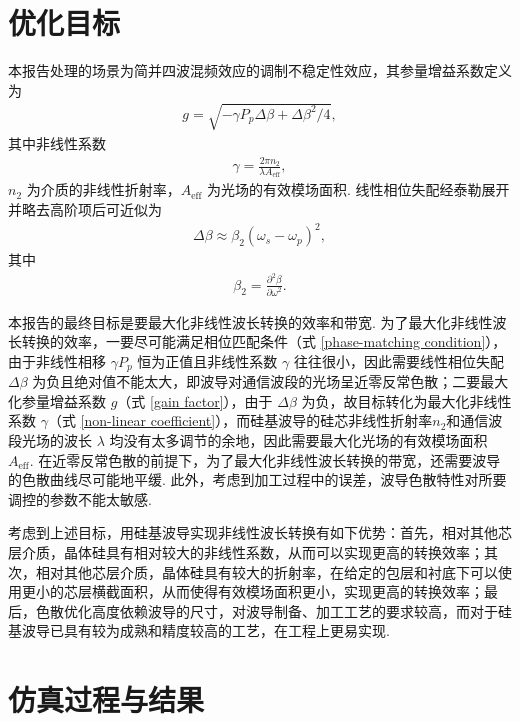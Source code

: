 \documentclass[zh]{assignment}
\begin{document}
\section{优化目标}

本报告处理的场景为简并四波混频效应的调制不稳定性效应，其参量增益系数定义为
\begin{align}
    \label{gain factor}
    g=\sqrt{-\gamma P_p\Delta\beta+\Delta\beta^2/4},
\end{align}
其中非线性系数
\begin{align}
    \label{non-linear coefficient}
    \gamma=\frac{2\pi n_2}{\lambda A_{\text{eff}}},
\end{align}
$n_2$ 为介质的非线性折射率，$A_{\text{eff}}$ 为光场的有效模场面积. 线性相位失配经泰勒展开并略去高阶项后可近似为
\begin{align}
    \Delta\beta\approx\beta_2(\omega_s-\omega_p)^2,
\end{align}
其中
\begin{align}
    \beta_2=\frac{\partial^2\beta}{\partial\omega^2}.
\end{align}

本报告的最终目标是要最大化非线性波长转换的效率和带宽. 为了最大化非线性波长转换的效率，一要尽可能满足相位匹配条件（式 \eqref{phase-matching condition}），由于非线性相移 $\gamma P_p$ 恒为正值且非线性系数 $\gamma$ 往往很小，因此需要线性相位失配 $\Delta\beta$ 为负且绝对值不能太大，即波导对通信波段的光场呈近零反常色散；二要最大化参量增益系数 $g$（式 \eqref{gain factor}），由于 $\Delta\beta$ 为负，故目标转化为最大化非线性系数 $\gamma$（式 \eqref{non-linear coefficient}），而硅基波导的硅芯非线性折射率$n_2$和通信波段光场的波长 $\lambda$ 均没有太多调节的余地，因此需要最大化光场的有效模场面积 $A_{\text{eff}}$. 在近零反常色散的前提下，为了最大化非线性波长转换的带宽，还需要波导的色散曲线尽可能地平缓. 此外，考虑到加工过程中的误差，波导色散特性对所要调控的参数不能太敏感.

考虑到上述目标，用硅基波导实现非线性波长转换有如下优势：首先，相对其他芯层介质，晶体硅具有相对较大的非线性系数，从而可以实现更高的转换效率；其次，相对其他芯层介质，晶体硅具有较大的折射率，在给定的包层和衬底下可以使用更小的芯层横截面积，从而使得有效模场面积更小，实现更高的转换效率；最后，色散优化高度依赖波导的尺寸，对波导制备、加工工艺的要求较高，而对于硅基波导已具有较为成熟和精度较高的工艺，在工程上更易实现.

\section{仿真过程与结果}
\end{document}
